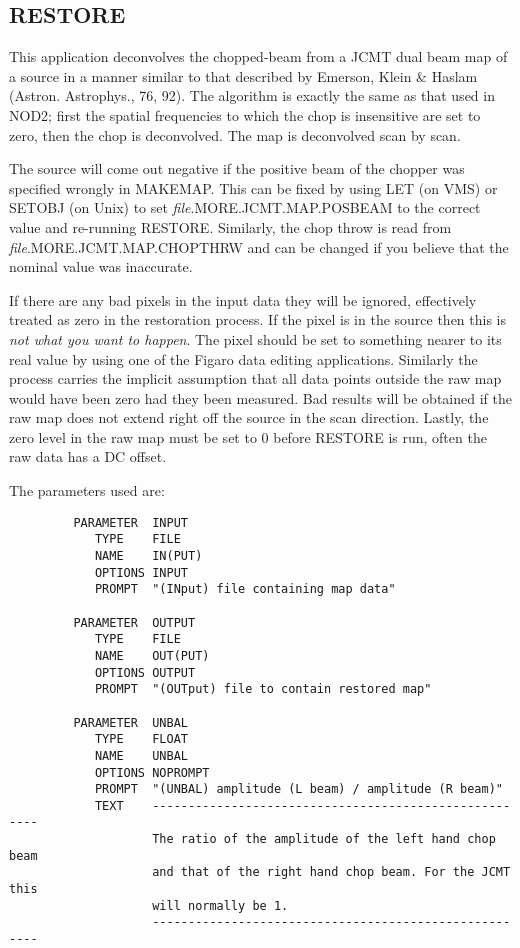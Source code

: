 \documentclass[twoside,11pt]{article}
\newcommand{\xlabel}[1]{}
\renewcommand{\_}{\texttt{\symbol{95}}}
\begin{document}
\goodbreak

\subsection{\xlabel{RESTORE}RESTORE}

This application deconvolves the chopped-beam from a JCMT dual  beam
map of a source in a manner similar to that described by  Emerson,
Klein \& Haslam (Astron. Astrophys., 76, 92). The algorithm  is exactly
the same as that used in NOD2; first the spatial  frequencies to which
the chop is insensitive are set to zero,  then the chop is
deconvolved. The map is deconvolved scan by scan.

The source will come out negative if the positive beam of the chopper
was specified wrongly in MAKEMAP. This can be fixed by using LET (on
VMS) or SETOBJ (on Unix) to
set {\em file}.MORE.JCMT.MAP.POS\_BEAM to the correct value and
re-running RESTORE. Similarly, the chop throw  is read from {\em
file}.MORE.\-JCMT.\-MAP.CHOP\_THRW and can be changed if you  believe that
the nominal value was inaccurate.

If there are any bad pixels in the input data they will be ignored,
effectively treated as zero in the restoration process. If the pixel
is in the source then this is {\em not what you want to happen}. The
pixel should be set to something nearer to its real value by using one
of the Figaro data editing applications. Similarly  the process
carries the implicit assumption that all data points outside the raw
map would have been zero had they been measured. Bad results will be
obtained if the raw map does not extend right off the source in the
scan direction. Lastly, the zero level in the raw map must be set to 0
before RESTORE is run, often the raw data has a DC offset.

\goodbreak

The parameters used are:

\begin{small}
\begin{verbatim}
         PARAMETER  INPUT
            TYPE    FILE
            NAME    IN(PUT)
            OPTIONS INPUT
            PROMPT  "(INput) file containing map data"

         PARAMETER  OUTPUT
            TYPE    FILE
            NAME    OUT(PUT)
            OPTIONS OUTPUT
            PROMPT  "(OUTput) file to contain restored map"

         PARAMETER  UNBAL
            TYPE    FLOAT
            NAME    UNBAL
            OPTIONS NOPROMPT
            PROMPT  "(UNBAL) amplitude (L beam) / amplitude (R beam)"
            TEXT    ------------------------------------------------------
                    The ratio of the amplitude of the left hand chop beam
                    and that of the right hand chop beam. For the JCMT this
                    will normally be 1.
                    ------------------------------------------------------
\end{verbatim}
\end{small}
\end{document}
